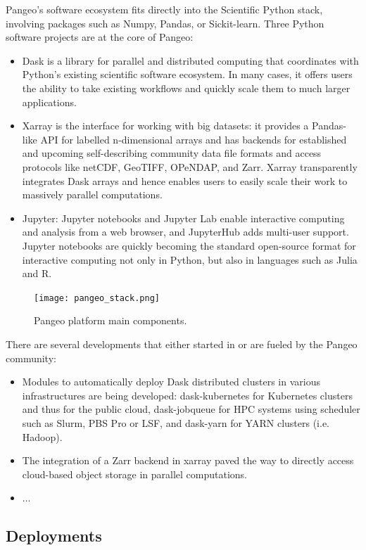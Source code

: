 \documentclass{article}
\begin{document}
Pangeo's software ecosystem fits directly into the Scientific Python stack, involving packages such as Numpy, Pandas, or Sickit-learn.  Three Python software projects are at the core of Pangeo:
\begin{itemize}
\item Dask is a library for parallel and distributed computing that coordinates with Python’s existing scientific software ecosystem.  In many cases, it offers users the ability to take existing workflows and quickly scale them to much larger applications.
\item Xarray is the interface for working with big datasets: it provides a Pandas-like API for labelled n-dimensional arrays and has backends for established and upcoming self-describing community data file formats and access protocols like netCDF, GeoTIFF, OPeNDAP, and Zarr.  Xarray transparently integrates Dask arrays and hence enables users to easily scale their work to massively parallel computations.
\item Jupyter: Jupyter notebooks and Jupyter Lab enable interactive computing and analysis from a web browser, and JupyterHub adds multi-user support.  Jupyter notebooks are quickly becoming the standard open-source format for interactive computing not only in Python, but also in languages such as Julia and R.
\end{itemize}

\begin{figure}
  \centering
  \texttt{[image: pangeo\_stack.png]}
  \caption{\label{pangeo_stack} Pangeo platform main components.}
\end{figure}

There are several developments that either started in or are fueled by the
Pangeo community:
\begin{itemize}
\item Modules to automatically deploy Dask distributed clusters in various infrastructures are being developed: dask-kubernetes for Kubernetes clusters and thus for the public cloud, dask-jobqueue\cite{b4} for HPC systems using scheduler such as Slurm, PBS Pro or LSF, and dask-yarn for YARN clusters (i.e. Hadoop).
\item The integration of a Zarr backend in xarray paved the way to directly access cloud-based object storage in parallel computations.
\item ...
\end{itemize}


\subsection{Deployments}
\label{ssec:deployments}
\end{document}
